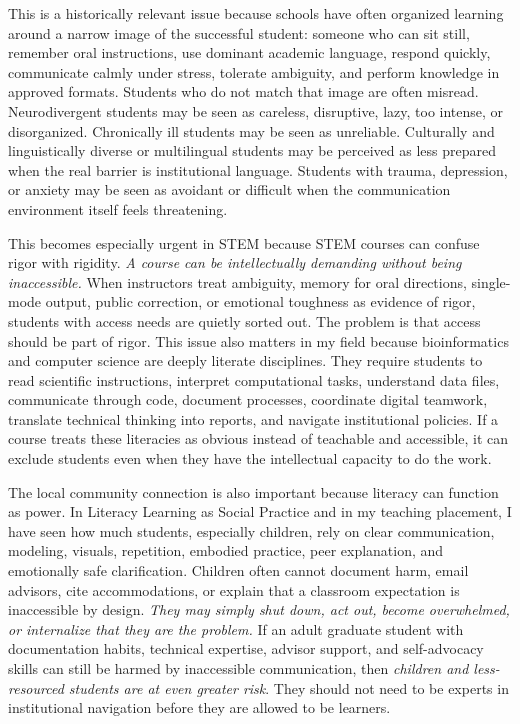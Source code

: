 This is a historically relevant issue because schools have often organized learning around a narrow image of the successful student: someone who can sit still, remember oral instructions, use dominant academic language, respond quickly, communicate calmly under stress, tolerate ambiguity, and perform knowledge in approved formats. Students who do not match that image are often misread. Neurodivergent students may be seen as careless, disruptive, lazy, too intense, or disorganized. Chronically ill students may be seen as unreliable. Culturally and linguistically diverse or multilingual students may be perceived as less prepared when the real barrier is institutional language. Students with trauma, depression, or anxiety may be seen as avoidant or difficult when the communication environment itself feels threatening.

This becomes especially urgent in STEM because STEM courses can confuse rigor with rigidity. \textit{A course can be intellectually demanding without being inaccessible.} When instructors treat ambiguity, memory for oral directions, single-mode output, public correction, or emotional toughness as evidence of rigor, students with access needs are quietly sorted out. The problem is that access should be part of rigor. This issue also matters in my field because bioinformatics and computer science are deeply literate disciplines. They require students to read scientific instructions, interpret computational tasks, understand data files, communicate through code, document processes, coordinate digital teamwork, translate technical thinking into reports, and navigate institutional policies. If a course treats these literacies as obvious instead of teachable and accessible, it can exclude students even when they have the intellectual capacity to do the work.

The local community connection is also important because literacy can function as power. In Literacy Learning as Social Practice and in my teaching placement, I have seen how much students, especially children, rely on clear communication, modeling, visuals, repetition, embodied practice, peer explanation, and emotionally safe clarification. Children often cannot document harm, email advisors, cite accommodations, or explain that a classroom expectation is inaccessible by design. \textit{They may simply shut down, act out, become overwhelmed, or internalize that they are the problem.} If an adult graduate student with documentation habits, technical expertise, advisor support, and self-advocacy skills can still be harmed by inaccessible communication, then \textit{children and less-resourced students are at even greater risk}. They should not need to be experts in institutional navigation before they are allowed to be learners.

